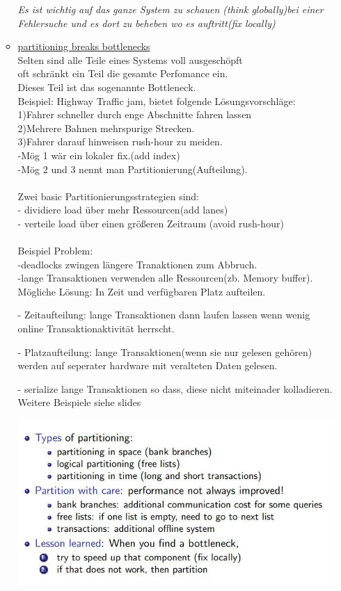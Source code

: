 \documentclass[12pt]{article}\pagestyle{myheadings}
\theoremstyle{plain}
\begin{document}
\begin{enumerate}
\begin{itemize}
\textit{Es ist wichtig auf das ganze System zu schauen (think globally)bei einer Fehlersuche und es dort zu beheben wo es auftritt(fix locally)}
\item \underline{partitioning breaks bottlenecks} \\
Selten sind alle Teile eines Systems voll ausgeschöpft\\
oft schränkt ein Teil die gesamte Perfomance ein.\\
Dieses Teil ist das sogenannte Bottleneck.\\
Beispiel: Highway Traffic jam, bietet folgende Lösungsvorschläge:\\
1)Fahrer schneller durch enge Abschnitte fahren lassen\\
2)Mehrere Bahnen mehrspurige Strecken.\\
3)Fahrer darauf hinweisen rush-hour zu meiden.\\
-Mög 1 wär ein  lokaler fix.(add index)\\
-Mög 2 und 3 nennt man Partitionierung(Aufteilung).\\ \\
Zwei basic Partitionierungsstrategien sind:\\
- dividiere load über mehr Ressourcen(add lanes)\\
- verteile load über einen größeren Zeitraum (avoid rush-hour)\\ \\
Beispiel Problem: \\
-deadlocks zwingen längere Tranaktionen zum Abbruch.\\
-lange Transaktionen verwenden alle Ressourcen(zb. Memory buffer).\\
Mögliche Lösung: In Zeit und verfügbaren Platz aufteilen.
\item[-]Zeitaufteilung: lange Transaktionen dann laufen lassen wenn wenig online Transaktionaktivität herrscht.\\
\item[-]Platzaufteilung: lange Transaktionen(wenn sie nur gelesen gehören) werden auf seperater hardware mit veralteten Daten gelesen.\\
\item[-] serialize lange Transaktionen so dass, diese nicht miteinader kolladieren.\\
Weitere Beispiele siehe slides \\
\begin{center}
\includegraphics[scale=0.8]{bottleneck.jpg}  

\end{center}
\end{itemize}
\end{enumerate}
\end{document}
